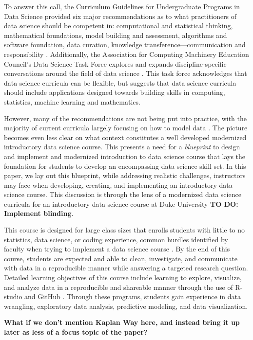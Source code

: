 \documentclass[
  12pt]{article}
\begin{document}
To answer this call, the Curriculum Guidelines for Undergraduate
Programs in Data Science provided six major recommendations as to what
practitioners of data science should be competent in: computational and
statistical thinking, mathematical foundations, model building and
assessment, algorithms and software foundation, data curation, knowledge
transference---communication and responsibility \citep{veaux_2017}.
Additionally, the Association for Computing Machinery Education
Council's Data Science Task Force explores and expands
discipline-specific conversations around the field of data science
\citep{Danyluk_2021}. This task force acknowledges that data science
curricula can be flexible, but suggests that data science curricula
should include applications designed towards building skills in
computing, statistics, machine learning and mathematics.

However, many of the recommendations are not being put into practice,
with the majority of current curricula largely focusing on how to model
data \citep{Donoho2017}. The picture becomes even less clear on what
context constitutes a well developed modernized introductory data
science course. This presents a need for a \emph{blueprint} to design
and implement and modernized introduction to data science course that
lays the foundation for students to develop an encompassing data science
skill set. In this paper, we lay out this blueprint, while addressing
realistic challenges, instructors may face when developing, creating,
and implementing an introductory data science course. This discussion is
through the lens of a modernized data science curricula for an
introductory data science course at Duke University \textbf{TO DO:
Implement blinding}.

This course is designed for large class sizes that enrolls students with
little to no statistics, data science, or coding experience, common
hurdles identified by faculty when trying to implement a data science
course \citep{Schwab2020}. By the end of this course, students are
expected and able to clean, investigate, and communicate with data in a
reproducible manner while answering a targeted research question.
Detailed learning objectives of this course include learning to explore,
visualize, and analyze data in a reproducible and shareable manner
through the use of R-studio and GitHub \citep{R21, github}. Through
these programs, students gain experience in data wrangling, exploratory
data analysis, predictive modeling, and data visualization.

\textbf{What if we don't mention Kaplan Way here, and instead bring it
up later as less of a focus topic of the paper?}
\end{document}
